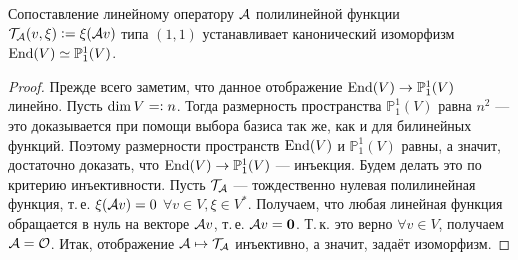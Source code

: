 \begin{proposal}
    Сопоставление линейному оператору $\mathcal{A}$ полилинейной функции $\mathcal{T}_{\mathcal{A}}(v, \xi) \vcentcolon = \xi(\mathcal{A} v)$ типа $(1, 1)$ устанавливает канонический изоморфизм $\operatorname{End}(V) \simeq \mathbb{P}_1^1(V)$.
\end{proposal}

\begin{proof}
    Прежде всего заметим, что данное отображение $\operatorname{End}(V) \to \mathbb{P}_1^1(V)$ линейно. Пусть $\dim V = \vcentcolon n$. Тогда размерность пространства $\mathbb{P}_1^1(V)$ равна $n^2$ --- это доказывается при помощи выбора базиса так же, как и для билинейных функций. Поэтому размерности пространств $\operatorname{End}(V)$ и $\mathbb{P}_1^1(V)$ равны, а значит, достаточно доказать, что $\operatorname{End}(V) \to \mathbb{P}_1^1(V)$ --- инъекция. Будем делать это по критерию инъективности. Пусть $\mathcal{T}_{\mathcal{A}}$ --- тождественно нулевая полилинейная функция, т.\,е. $\xi(\mathcal{A} v) = 0$ $\forall v \in V, \xi \in V^\ast$. Получаем, что любая линейная функция обращается в нуль на векторе $\mathcal{A} v$, т.\,е. $\mathcal{A} v = \boldsymbol{0}$. Т.\,к. это верно $\forall v \in V$, получаем $\mathcal{A} = \mathcal{O}$. Итак, отображение $\mathcal{A} \mapsto \mathcal{T}_{\mathcal{A}}$ инъективно, а значит, задаёт изоморфизм.
\end{proof}


